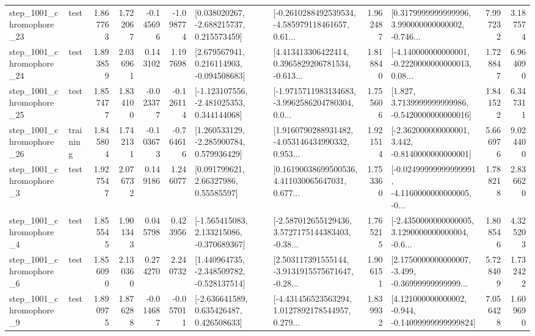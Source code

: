 \begin{tabular}{llrrrrllrlrr}
 step\_1001\_chromophore\_23 &      test &      1.867763 &    1.722067 &     -0.145696 & -1.098774 &    [0.038020267, -2.688215737, 0.215573459] &  [-0.2610288492539534, -4.585979118461657, 0.61... &       1.962487 &  [0.3179999999999996, 3.990000000000002, -0.746... &            7.997232 &          3.187574 \\
 step\_1001\_chromophore\_24 &      test &      1.893859 &    2.036961 &      0.143102 &  1.197698 &    [2.679567941, 0.216114903, -0.094508683] &  [4.413413306422414, 0.3965829206781534, -0.613... &       1.818840 &  [-4.140000000000001, -0.2220000000000013, 0.08... &            1.728847 &          6.964090 \\
 step\_1001\_chromophore\_25 &      test &      1.857477 &    1.834100 &     -0.023377 & -0.126114 &   [-1.123107556, -2.481025353, 0.344144068] &  [-1.9715711983134683, -3.9962586204780304, 0.0... &       1.755606 &   [1.827, 3.7139999999999986, -0.5420000000000016] &            1.841522 &          6.347311 \\
 step\_1001\_chromophore\_26 &  training &      1.845804 &    1.742131 &     -0.103673 & -0.764616 &    [1.260533129, -2.285900784, 0.579936429] &  [1.9160790288931482, -4.053146434990332, 0.953... &       1.921514 &   [-2.362000000000001, 3.442, -0.8140000000000001] &            5.666976 &          9.024400 \\
  step\_1001\_chromophore\_3 &      test &      1.927547 &    2.076732 &      0.149186 &  1.246077 &       [0.091799621, 2.66327986, 0.55585597] &  [0.16190038699500536, 4.411030065647031, 0.677... &       1.753360 &  [-0.02499999999999991, -4.1160000000000005, -0... &            1.788218 &          2.836620 \\
  step\_1001\_chromophore\_4 &      test &      1.855545 &    1.901343 &      0.045798 &  0.423956 &   [-1.565415083, 2.133215086, -0.370689367] &  [-2.587012655129436, 3.5727175144383403, -0.38... &       1.765215 &  [-2.4350000000000005, 3.1290000000000004, -0.6... &            1.808546 &          4.325203 \\
  step\_1001\_chromophore\_6 &      test &      1.856090 &    2.130360 &      0.274270 &  2.240732 &   [1.440964735, -2.348509782, -0.528137514] &  [2.503117391555144, -3.9131915575671647, -0.28... &       1.906151 &  [2.1750000000000007, -3.499, -0.36999999999999... &            5.728409 &          1.732422 \\
  step\_1001\_chromophore\_9 &      test &      1.890975 &    1.876288 &     -0.014687 & -0.057011 &    [-2.636641589, 0.635426487, 0.426508633] &  [-4.431456523563294, 1.0127892178544957, 0.279... &       1.839932 &  [4.121000000000002, -0.944, -0.14099999999999824] &            7.056428 &          1.609690 \\

\end{tabular}
